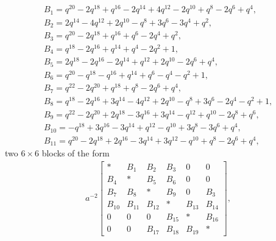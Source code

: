\documentclass[pdftex]{sigma}
\numberwithin{equation}{section}
\theoremstyle{definition}
\newcommand{\flac}[2]{#1}
\begin{document}
\begin{gather*}
 B_1 =
\flac{q^{20}}{a^2}-\flac{2q^{18}}{a^2}+\flac{q^{16}}{a^2}-\flac{2q^{14}}{a^2}+\flac{4q^{12}}{a^2}-\flac{2q^{10}}{a^2}+\flac{q^{8}}{a^2}-\flac{2q^{6}}{a^2}+\flac{q^{4}}{a^2},\\
 B_2 =
\flac{2q^{14}}{a^2}-\flac{4q^{12}}{a^2}+\flac{2q^{10}}{a^2}-\flac{q^{8}}{a^2}+\flac{3q^{6}}{a^2}-\flac{3q^{4}}{a^2}+\flac{q^{2}}{a^2}, \\
 B_3 =
\flac{q^{20}}{a^2}-\flac{2q^{18}}{a^2}+\flac{q^{16}}{a^2}+\flac{q^{6}}{a^2}-\flac{2q^{4}}{a^2}+\flac{q^{2}}{a^2}, \\
 B_4 =
\flac{q^{18}}{a^2}-\flac{2q^{16}}{a^2}+\flac{q^{14}}{a^2}+\flac{q^{4}}{a^2}-\flac{2q^{2}}{a^2}+\flac{1}{a^2}, \\
 B_5 =
\flac{2q^{18}}{a^2}-\flac{2q^{16}}{a^2}-\flac{2q^{14}}{a^2}+\flac{q^{12}}{a^2}+\flac{2q^{10}}{a^2}-\flac{2q^{6}}{a^2}+\flac{q^{4}}{a^2}, \\
 B_6 =
\flac{q^{20}}{a^2}-\flac{q^{18}}{a^2}-\flac{q^{16}}{a^2}+\flac{q^{14}}{a^2}+\flac{q^{6}}{a^2}-\flac{q^{4}}{a^2}-\flac{q^{2}}{a^2}+\flac{1}{a^2}, \\
 B_7 =
\flac{q^{22}}{a^2}-\flac{2q^{20}}{a^2}+\flac{q^{18}}{a^2}+\flac{q^{8}}{a^2}-\flac{2q^{6}}{a^2}+\flac{q^{4}}{a^2}, \\
 B_8 =
\flac{q^{18}}{a^2}-\flac{2q^{16}}{a^2}+\flac{3q^{14}}{a^2}-\flac{4q^{12}}{a^2}+\flac{2q^{10}}{a^2}-\flac{q^{8}}{a^2}+\flac{3q^{6}}{a^2}-\flac{2q^{4}}{a^2}-\flac{q^{2}}{a^2}+\flac{1}{a^2}, \\
 B_9 =
\flac{q^{22}}{a^2}-\flac{2q^{20}}{a^2}+\flac{2q^{18}}{a^2}-\flac{3q^{16}}{a^2}+\flac{3q^{14}}{a^2}-\flac{q^{12}}{a^2}+\flac{q^{10}}{a^2}-\flac{2q^{8}}{a^2}+\flac{q^{6}}{a^2}, \\
 B_{10} =
-\flac{q^{18}}{a^2}+\flac{3q^{16}}{a^2}-\flac{3q^{14}}{a^2}+\flac{q^{12}}{a^2}-\flac{q^{10}}{a^2}+\flac{3q^{8}}{a^2}-\flac{3q^{6}}{a^2}+\flac{q^{4}}{a^2}, \\
 B_{11} =
\flac{q^{20}}{a^2}-\flac{2q^{18}}{a^2}+\flac{2q^{16}}{a^2}-\flac{3q^{14}}{a^2}+\flac{3q^{12}}{a^2}-\flac{q^{10}}{a^2}+\flac{q^{8}}{a^2}-\flac{2q^{6}}{a^2}+\flac{q^{4}}{a^2},
\end{gather*}
two $6 \times 6$ blocks of the form
\begin{align*}
 a^{-2} \begin{bmatrix}
 * & B_1 & B_2 & B_3 & 0 & 0 \\
 B_4 & * & B_5 & B_6 & 0 & 0 \\
 B_7 & B_8 & * & B_9 & 0 & B_3 \\
 B_{10} & B_{11} & B_{12} & * & B_{13} & B_{14} \\
 0 & 0 & 0 & B_{15} & * & B_{16} \\
 0 & 0 & B_{17} & B_{18} & B_{19} & *
 \end{bmatrix},
\end{align*}
\end{document}
